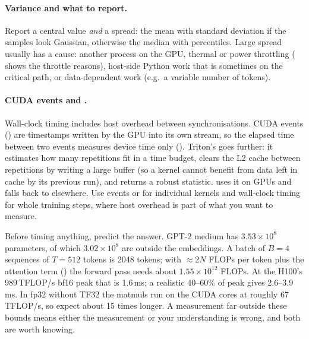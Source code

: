 \paragraph{Variance and what to report.} Report a central value \emph{and} a spread: the mean
with standard deviation if the samples look Gaussian, otherwise the median with percentiles.
Large spread usually has a cause: another process on the GPU, thermal or power throttling
( shows the throttle reasons), host-side Python work that is
sometimes on the critical path, or data-dependent work (e.g.\ a variable number of tokens).

\paragraph{CUDA events and .} Wall-clock timing includes host overhead between
synchronisations. CUDA events () are timestamps written
by the GPU into its own stream, so the elapsed time between two events measures device time only
(). Triton's  goes further: it estimates
how many repetitions fit in a time budget, clears the L2 cache between repetitions by writing a
large buffer (so a kernel cannot benefit from data left in cache by its previous run), and returns
a robust statistic.  uses it on GPUs and falls back to  elsewhere.
Use events or  for individual kernels and wall-clock timing for whole training
steps, where host overhead is part of what you want to measure.

\begin{napkinmath}
Before timing anything, predict the answer. GPT-2 medium has $3.53\times10^{8}$ parameters, of
which $3.02\times10^8$ are outside the embeddings. A batch of $B=4$ sequences of $T=512$ tokens is
2048 tokens; with $\approx2N$ FLOPs per token plus the attention term ()
the forward pass needs about $1.55\times10^{12}$ FLOPs. At the H100's 989\,TFLOP/s bf16 peak that is
1.6\,ms; a realistic 40--60\% of peak gives 2.6--3.9\,ms. In fp32 without TF32 the matmuls run on
the CUDA cores at roughly 67\,TFLOP/s, so expect about 15 times longer. A measurement far outside
these bounds means either the measurement or your understanding is wrong, and both are worth
knowing.
\end{napkinmath}

